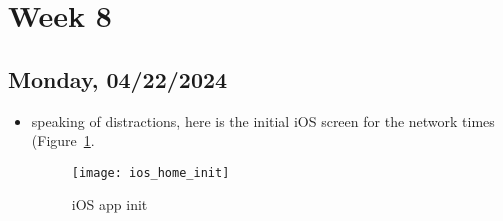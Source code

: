 \newpage
\section{Week 8}
\subsection*{Monday, 04/22/2024}
\begin{itemize}
    \item speaking of distractions, here is the initial iOS screen for the
        network times (Figure~\ref{fig:ios_home_init}. 
        \begin{figure}[ht]
            \centering
            \texttt{[image: ios\_home\_init]}
            \captionsetup{labelfont=bf, textfont=it}
            \caption{iOS app init}
            \label{fig:ios_home_init}
        \end{figure}
\end{itemize}
